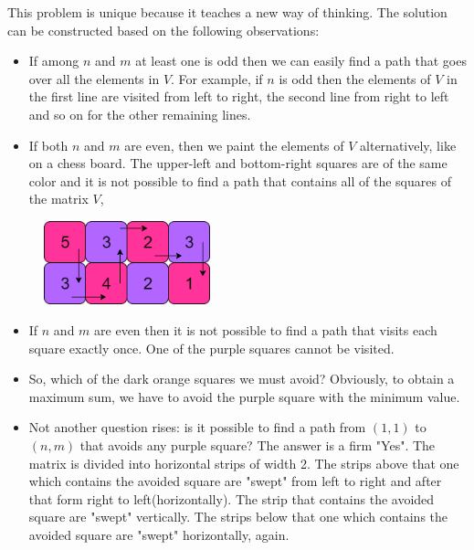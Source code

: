 \documentclass[letterpaper]{article}
\begin{document}
This problem is unique because it teaches a new way of thinking. The solution can be constructed based on the following observations:

\begin{itemize}
    \item If among $n$ and $m$ at least one is odd then we can easily find a path that goes over all the elements in $V$. For example, if $n$ is odd then the elements of $V$ in the first line are visited from left to right, the second line from right to left and so on for the other remaining lines.

    \item If both $n$ and $m$ are even, then we paint the elements of $V$ alternatively, like on a chess board. The upper-left and bottom-right squares are of the same color and it is not possible to find a path that contains all of the squares of the matrix $V$,
\end{itemize}

\begin{figure} [h!]
\centering
\includegraphics[width=0.43\textwidth]{pngOfDiagrams/gamesandpaths8.png}
\end{figure}

\begin{itemize}
    \item If $n$ and $m$ are even then it is not possible to find a path that visits each square exactly once. One of the purple squares cannot be visited.

    \item So, which of the dark orange squares we must avoid? Obviously, to obtain a maximum sum, we have to avoid the purple square with the minimum value.

    \item Not another question rises: is it possible to find a path from $(1,1)$ to $(n,m)$ that avoids any purple square? The answer is a firm "Yes". The matrix is divided into horizontal strips of width 2. The strips above that one which contains the avoided square are "swept" from left to right and after that form right to left(horizontally).
    The strip that contains the avoided square are "swept" vertically. The strips below that one which contains the avoided square are "swept" horizontally, again.

\end{itemize}
\end{document}
